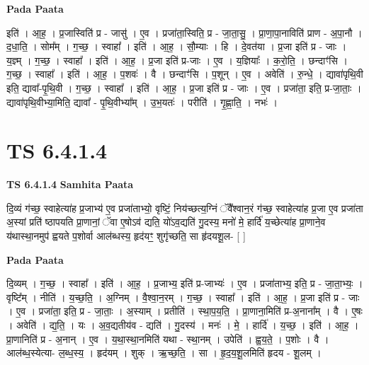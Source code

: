\documentclass[17pt]{extarticle}
\begin{document}
\textbf{Pada Paata} \newline

इति॑ । आ॒ह॒ । प्र॒जास्विति॑ प्र - जासु॑ । ए॒व । प्रजा॑ता॒स्विति॒ प्र - जा॒ता॒सु॒ । प्रा॒णा॒पा॒नाविति॑ प्राण - अ॒पा॒नौ । द॒धा॒ति॒ । सोम᳚म् । ग॒च्छ॒ । स्वाहा᳚ । इति॑ । आ॒ह॒ । सौ॒म्याः । हि । दे॒वत॑या । प्र॒जा इति॑ प्र - जाः । य॒ज्ञ्म् । ग॒च्छ॒ । स्वाहा᳚ । इति॑ । आ॒ह॒ । प्र॒जा इति॑ प्र-जाः । ए॒व । य॒ज्ञियाः᳚ । क॒रो॒ति॒ । छन्दाꣳ॑सि । ग॒च्छ॒ । स्वाहा᳚ । इति॑ । आ॒ह॒ । प॒शवः॑ । वै । छन्दाꣳ॑सि । प॒शून् । ए॒व । अवेति॑ । रु॒न्धे॒ । द्यावा॑पृथि॒वी इति॒ द्यावा᳚-पृ॒थि॒वी । ग॒च्छ॒ । स्वाहा᳚ । इति॑ । आ॒ह॒ । प्र॒जा इति॑ प्र - जाः । ए॒व । प्रजा॑ता॒ इति॒ प्र-जा॒ताः॒ । द्यावा॑पृथि॒वीभ्या॒मिति॒ द्यावा᳚ - पृ॒थि॒वीभ्या᳚म् । उ॒भ॒यतः॑ । परीति॑ । गृ॒ह्णा॒ति॒ । नभः॑ ।  \newline




\section*{ TS 6.4.1.4 }

\textbf{TS 6.4.1.4 } \newline
\textbf{Samhita Paata} \newline

दि॒व्यं ग॑च्छ॒ स्वाहेत्या॑ह प्र॒जाभ्य॑ ए॒व प्रजा॑ताभ्यो॒ वृष्टिं॒ निय॑च्छत्य॒ग्निं ॅवै᳚श्वान॒रं ग॑च्छ॒ स्वाहेत्या॑ह प्र॒जा ए॒व प्रजा॑ता अ॒स्यां प्रति॑ ष्ठापयति प्रा॒णानां॒ ॅवा ए॒षोऽव॑ द्यति॒ यो॑ऽव॒द्यति॑ गु॒दस्य॒ मनो॑ मे॒ हार्दि॑ य॒च्छेत्या॑ह प्रा॒णाने॒व य॑थास्था॒नमुप॑ ह्वयते प॒शोर्वा आल॑ब्धस्य॒ हृद॑यꣳ॒॒ शुगृ॑च्छति॒ सा हृ॑दयशू॒ल- [  ] \newline

\textbf{Pada Paata} \newline

दि॒व्यम् । ग॒च्छ॒ । स्वाहा᳚ । इति॑ । आ॒ह॒ । प्र॒जाभ्य॒ इति॑ प्र-जाभ्यः॑ । ए॒व । प्रजा॑ताभ्य॒ इति॒ प्र - जा॒ता॒भ्यः॒ । वृष्टि᳚म् । नीति॑ । य॒च्छ॒ति॒ । अ॒ग्निम् । वै॒श्वा॒न॒रम् । ग॒च्छ॒ । स्वाहा᳚ । इति॑ । आ॒ह॒ । प्र॒जा इति॑ प्र - जाः । ए॒व । प्रजा॑ता॒ इति॒ प्र - जा॒ताः॒ । अ॒स्याम् । प्रतीति॑ । स्था॒प॒य॒ति॒ । प्रा॒णाना॒मिति॑ प्र-अ॒नाना᳚म् । वै । ए॒षः । अवेति॑ । द्य॒ति॒ । यः । अ॒व॒द्यतीय॑व - द्यति॑ । गु॒दस्य॑ । मनः॑ । मे॒ । हार्दि॑ । य॒च्छ॒ । इति॑ । आ॒ह॒ । प्रा॒णानिति॑ प्र - अ॒नान् । ए॒व । य॒था॒स्था॒नमिति॑ यथा - स्था॒नम् । उपेति॑ । ह्व॒य॒ते॒ । प॒शोः । वै । आल॑ब्ध॒स्येत्या- ल॒ब्ध॒स्य॒ । हृद॑यम् । शुक् । ऋ॒च्छ॒ति॒ । सा । हृ॒द॒य॒शू॒लमिति॑ हृदय - शू॒लम् ।  \newline
\end{document}

